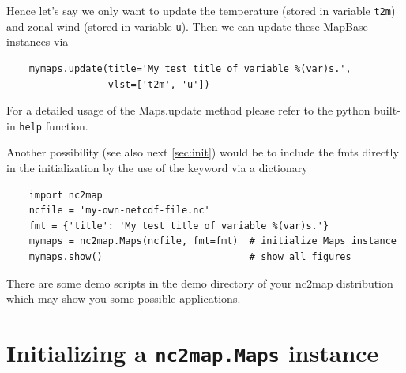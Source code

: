 Hence let's say we only want to update the temperature (stored in variable \lstinline|t2m|) and zonal wind (stored in variable \lstinline|u|). Then we can update these \gls{MapBase} instances via
\begin{lstlisting}
	mymaps.update(title='My test title of variable %(var)s.', 
	              vlst=['t2m', 'u'])
\end{lstlisting}
For a detailed usage of the \gls{Maps.update} method please refer to the python built-in \lstinline|help| function.

Another possibility (see also next \autoref{sec:init}) would be to include the \glspl{fmt} directly in the initialization by the use of the  keyword via a dictionary
\begin{lstlisting}
	import nc2map
	ncfile = 'my-own-netcdf-file.nc'
	fmt = {'title': 'My test title of variable %(var)s.'}
	mymaps = nc2map.Maps(ncfile, fmt=fmt)  # initialize Maps instance
	mymaps.show()                 	       # show all figures
\end{lstlisting}
There are some demo scripts in the demo directory of your nc2map distribution which may show you some possible applications.

\section{Initializing a \texttt{nc2map.Maps} instance} \label{sec:init}
